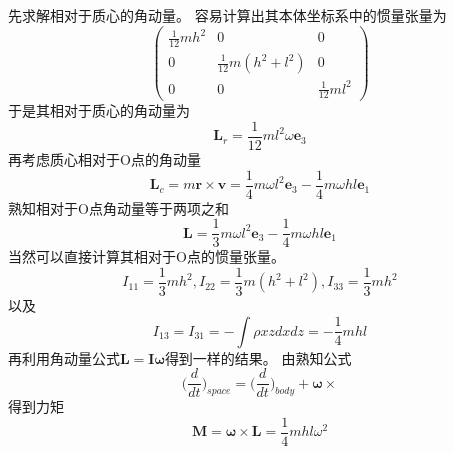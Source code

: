 \begin{solution}
    先求解相对于质心的角动量。
    容易计算出其本体坐标系中的惯量张量为
    $$\begin{pmatrix}
        \frac{1}{12}mh^2&0&0\\0&\frac{1}{12}m(h^2+l^2)&0\\0&0&\frac{1}{12}ml^2
    \end{pmatrix}$$
    于是其相对于质心的角动量为
    $$\textbf{L}_r=\frac{1}{12}ml^2\omega \textbf{e}_3$$
    再考虑质心相对于O点的角动量
    $$\textbf{L}_c=m\textbf{r}\times\textbf{v}=\frac14m\omega l^2\textbf{e}_3-\frac14m\omega hl\textbf{e}_1$$
    熟知相对于O点角动量等于两项之和
    $$\textbf{L}=\frac13m\omega l^2\textbf{e}_3-\frac14m\omega hl\textbf{e}_1$$
    当然可以直接计算其相对于O点的惯量张量。
    $$I_{11}=\frac13mh^2,I_{22}=\frac13m(h^2+l^2),I_33=\frac13mh^2$$
    以及
    $$I_{13}=I_{31}=-\int\rho xzdxdz=-\frac14mhl$$
    再利用角动量公式$\textbf{L}=\textbf{I}\boldsymbol{\omega}$得到一样的结果。
    由熟知公式
    $$\Big(\frac{d}{dt}\Big)_{space}=\Big(\frac{d}{dt}\Big)_{body}+\boldsymbol{\omega}\times$$
    得到力矩
    $$\textbf{M}=\boldsymbol{\omega}\times\textbf{L}=\frac14mhl\omega^2$$
\end{solution}
